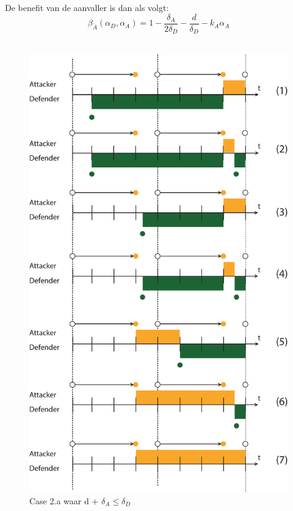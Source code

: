 \documentclass[master=cws, masteroption=vs,english]{kulemt}
\begin{document}
\begin{abstract*}
De benefit van de aanvaller is dan als volgt:
\begin{equation}\label{first}
\beta_{A}(\alpha_{D},\alpha_{A}) = 1 -\dfrac{\delta_{A}}{2\delta_{D}} - \dfrac{d}{\delta_{D}} - k_{A} \alpha_{A} 
\end{equation}\\

\begin{figure}[hbtp]
\centering
\includegraphics[scale=0.5]{../../doc/template/Images/FlipIt2}
\caption{Case 2.a waar d + $\delta_{A} \leq \delta_{D}$}
\label{fig:case2}
\end{figure}



\end{abstract*}
\end{document}
